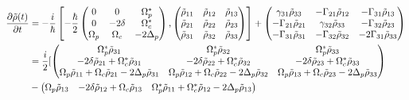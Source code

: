 \begin{equation}
    \begin{split}
        \pdv{\tilde{\rho}(t)}{t}  &= -\frac{i}{\hbar} \left[ - \frac{\hbar}{2} \begin{pmatrix}
    0 & 0 & \Omega_p^* \\
    0 & - 2 \delta & \Omega_c^* \\
    \Omega_p & \Omega_c & - 2 \Delta_p
\end{pmatrix} ,  \begin{pmatrix}
\tilde{\rho}_{11} & \tilde{\rho}_{12} & \tilde{\rho}_{13} \\
\tilde{\rho}_{21} & \tilde{\rho}_{22} & \tilde{\rho}_{23} \\
\tilde{\rho}_{31} & \tilde{\rho}_{32} & \tilde{\rho}_{33} \\
\end{pmatrix}\right] + 
        \begin{pmatrix} 
         \gamma_{31} \tilde{\rho}_{33} & -\Gamma_{21} \tilde{\rho}_{12} & -\Gamma_{31} \tilde{\rho}_{13} \\ 
        -\Gamma_{21} \tilde{\rho}_{21} & \gamma_{32} \tilde{\rho}_{33} & -\Gamma_{32} \tilde{\rho}_{23} \\ 
        -\Gamma_{31} \tilde{\rho}_{31} & -\Gamma_{32} \tilde{\rho}_{32} & - 2 \Gamma_{31} \tilde{\rho}_{33} 
        \end{pmatrix}\\
    &= \frac{i}{2} [\begin{pmatrix}
            \Omega_p^* \tilde{\rho}_{31} &  \Omega_p^* \tilde{\rho}_{32} &  \Omega_p^* \tilde{\rho}_{33} \\
            - 2 \delta \tilde{\rho}_{21} + \Omega_c^* \tilde{\rho}_{31} &  
            - 2 \delta \tilde{\rho}_{22} + \Omega_c^* \tilde{\rho}_{32} &  
            - 2 \delta \tilde{\rho}_{23} + \Omega_c^* \tilde{\rho}_{33} \\
            \Omega_p \tilde{\rho}_{11} + \Omega_c \tilde{\rho}_{21} - 2 \Delta_p \tilde{\rho}_{31} & 
            \Omega_p \tilde{\rho}_{12} + \Omega_c \tilde{\rho}_{22} - 2 \Delta_p \tilde{\rho}_{32} & 
            \Omega_p \tilde{\rho}_{13} + \Omega_c \tilde{\rho}_{23} - 2 \Delta_p \tilde{\rho}_{33}
        \end{pmatrix} \\
    &- \begin{pmatrix}
            \Omega_p \tilde{\rho}_{13} & - 2 \delta \tilde{\rho}_{12} + \Omega_c \tilde{\rho}_{13} & 
            \Omega_p^* \tilde{\rho}_{11} + \Omega_c^* \tilde{\rho}_{12} - 2 \Delta_p \tilde{\rho}_{13} \\

\end{pmatrix}
\end{split}
\end{equation}
